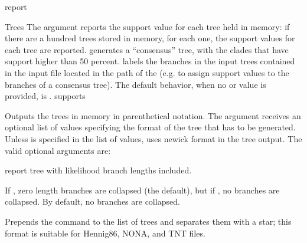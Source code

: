 \begin{command}{report}{}
\begin{arguments}
\begin{argumentgroup}{Trees}
{                The argument  reports the support value
                for each tree held in memory: if there are a hundred trees stored 
                in memory, for each one, the support values for each tree are reported. 
                generates a ``consensus'' tree, with the clades that have
                support higher than 50 percent. \poystring labels the branches
                in the input trees contained in the input file located in the path of
                the \poystring (e.g. to assign support values to the branches of a consensus
                tree). The default behavior, when no
                 or  value is
                provided, is .}
                {supports}

                {Outputs the trees in memory in parenthetical notation. The argument
                 receives an optional list of values
                specifying the format of the tree that has to be generated.
                Unless  is specified in the list of values, 
                 uses newick format in the tree output. The
                valid optional arguments are:  
                
                \begin{description}


                        {report tree with likelihood branch lengths included.}
                        {}

                        {If , zero length branches are collapsed (the
                        default), but if , no branches are
                        collapsed.  By default, no branches are collapsed.}
                        {}

                        {Prepends the  command to the list of
                        trees and separates them with a star; this format is
                        suitable for Hennig86, NONA, and TNT files.}
                        {}
                        

\end{description}}
\end{argumentgroup}
\end{arguments}
\end{command}
